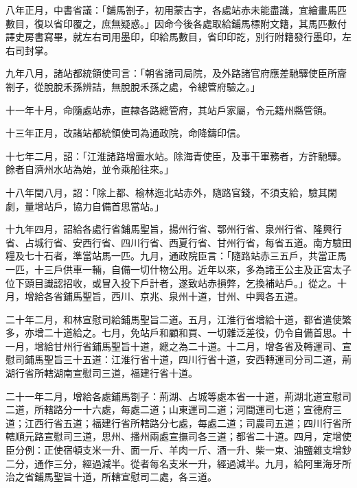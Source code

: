 \begin{pinyinscope}
 八年正月，中書省議：「鋪馬劄子，初用蒙古字，各處站赤未能盡識，宜繪畫馬匹數目，復以省印覆之，庶無疑惑。」因命今後各處取給鋪馬標附文籍，其馬匹數付譯史房書寫畢，就左右司用墨印，印給馬數目，省印印訖，別行附籍發行墨印，左右司封掌。



 九年八月，諸站都統領使司言：「朝省諸司局院，及外路諸官府應差馳驛使臣所齎劄子，從脫脫禾孫辨詰，無脫脫禾孫之處，令總管府驗之。」



 十一年十月，命隨處站赤，直隸各路總管府，其站戶家屬，令元籍州縣管領。



 十三年正月，改諸站都統領使司為通政院，命降鑄印信。



 十七年二月，詔：「江淮諸路增置水站。除海青使臣，及事干軍務者，方許馳驛。餘者自濟州水站為始，並令乘船往來。」



 十八年閏八月，詔：「除上都、榆林迤北站赤外，隨路官錢，不須支給，驗其閑劇，量增站戶，協力自備首思當站。」



 十九年四月，詔給各處行省鋪馬聖旨，揚州行省、鄂州行省、泉州行省、隆興行省、占城行省、安西行省、四川行省、西夏行省、甘州行省，每省五道。南方驗田糧及七十石者，準當站馬一匹。九月，通政院臣言：「隨路站赤三五戶，共當正馬一匹，十三戶供車一輛，自備一切什物公用。近年以來，多為諸王公主及正宮太子位下頭目識認招收，或冒入投下戶計者，遂致站赤損弊，乞換補站戶。」從之。十月，增給各省鋪馬聖旨，西川、京兆、泉州十道，甘州、中興各五道。



 二十年二月，和林宣慰司給鋪馬聖旨二道。五月，江淮行省增給十道，都省遣使繁多，亦增二十道給之。七月，免站戶和顧和買、一切雜泛差役，仍令自備首思。十一月，增給甘州行省鋪馬聖旨十道，總之為二十道。十二月，增各省及轉運司、宣慰司鋪馬聖旨三十五道：江淮行省十道，四川行省十道，安西轉運司分司二道，荊湖行省所轄湖南宣慰司三道，福建行省十道。



 二十一年二月，增給各處鋪馬劄子：荊湖、占城等處本省一十道，荊湖北道宣慰司二道，所轄路分一十六處，每處二道；山東運司二道；河間運司七道；宣德府三道；江西行省五道；福建行省所轄路分七處，每處二道；司農司五道；四川行省所轄順元路宣慰司三道，思州、播州兩處宣撫司各三道；都省二十道。四月，定增使臣分例：正使宿頓支米一升、面一斤、羊肉一斤、酒一升、柴一束、油鹽雜支增鈔二分，通作三分，經過減半。從者每名支米一升，經過減半。九月，給阿里海牙所治之省鋪馬聖旨十道，所轄宣慰司二處，各三道。




\end{pinyinscope}

